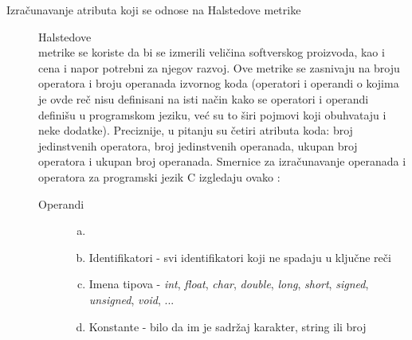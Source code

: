 \documentclass[12pt,oneside]{memoir}
\begin{document}
\begin{description}
\item[Izračunavanje atributa koji se odnose na Halstedove metrike]
Halstedove \\metrike se koriste da bi se izmerili veličina softverskog proizvoda, kao i cena i napor potrebni za njegov razvoj. Ove metrike se zasnivaju na broju operatora i broju operanada izvornog koda (operatori i operandi o kojima je ovde reč nisu definisani na isti način kako se operatori i operandi definišu u programskom jeziku, već su to širi pojmovi koji obuhvataju
i neke dodatke). Preciznije, u pitanju su četiri atributa koda: broj jedinstvenih operatora, broj jedinstvenih operanada, ukupan broj operatora i ukupan broj operanada.  Smernice za izračunavanje operanada i operatora za programski jezik C izgledaju ovako \cite{halstead}:
\begin{description}
\item[Operandi]
	\begin{enumerate}[(a)]
		\item[]
		\item Identifikatori - svi identifikatori koji ne spadaju u ključne reči
		\item Imena tipova - \textit{int}, \textit{float}, \textit{char}, \textit{double}, \textit{long}, \textit{short}, \textit{signed}, \textit{unsigned}, \textit{void}, ... 
		\item Konstante - bilo da im je sadržaj karakter, string ili broj
	\end{enumerate}


\end{description}
\end{description}
\end{document}
